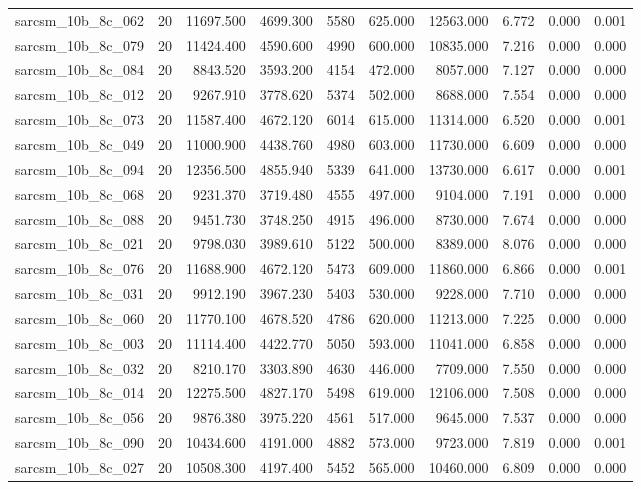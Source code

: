 \begin{tabular}{lrrrrrrrrr}
sarcsm\_10b\_8c\_062 & 20 & 11697.500 & 4699.300 & 5580 & 625.000 & 12563.000 & 6.772 & 0.000 & 0.001 \\
sarcsm\_10b\_8c\_079 & 20 & 11424.400 & 4590.600 & 4990 & 600.000 & 10835.000 & 7.216 & 0.000 & 0.000 \\
sarcsm\_10b\_8c\_084 & 20 & 8843.520 & 3593.200 & 4154 & 472.000 & 8057.000 & 7.127 & 0.000 & 0.000 \\
sarcsm\_10b\_8c\_012 & 20 & 9267.910 & 3778.620 & 5374 & 502.000 & 8688.000 & 7.554 & 0.000 & 0.000 \\
sarcsm\_10b\_8c\_073 & 20 & 11587.400 & 4672.120 & 6014 & 615.000 & 11314.000 & 6.520 & 0.000 & 0.001 \\
sarcsm\_10b\_8c\_049 & 20 & 11000.900 & 4438.760 & 4980 & 603.000 & 11730.000 & 6.609 & 0.000 & 0.000 \\
sarcsm\_10b\_8c\_094 & 20 & 12356.500 & 4855.940 & 5339 & 641.000 & 13730.000 & 6.617 & 0.000 & 0.001 \\
sarcsm\_10b\_8c\_068 & 20 & 9231.370 & 3719.480 & 4555 & 497.000 & 9104.000 & 7.191 & 0.000 & 0.000 \\
sarcsm\_10b\_8c\_088 & 20 & 9451.730 & 3748.250 & 4915 & 496.000 & 8730.000 & 7.674 & 0.000 & 0.000 \\
sarcsm\_10b\_8c\_021 & 20 & 9798.030 & 3989.610 & 5122 & 500.000 & 8389.000 & 8.076 & 0.000 & 0.000 \\
sarcsm\_10b\_8c\_076 & 20 & 11688.900 & 4672.120 & 5473 & 609.000 & 11860.000 & 6.866 & 0.000 & 0.001 \\
sarcsm\_10b\_8c\_031 & 20 & 9912.190 & 3967.230 & 5403 & 530.000 & 9228.000 & 7.710 & 0.000 & 0.000 \\
sarcsm\_10b\_8c\_060 & 20 & 11770.100 & 4678.520 & 4786 & 620.000 & 11213.000 & 7.225 & 0.000 & 0.000 \\
sarcsm\_10b\_8c\_003 & 20 & 11114.400 & 4422.770 & 5050 & 593.000 & 11041.000 & 6.858 & 0.000 & 0.000 \\
sarcsm\_10b\_8c\_032 & 20 & 8210.170 & 3303.890 & 4630 & 446.000 & 7709.000 & 7.550 & 0.000 & 0.000 \\
sarcsm\_10b\_8c\_014 & 20 & 12275.500 & 4827.170 & 5498 & 619.000 & 12106.000 & 7.508 & 0.000 & 0.000 \\
sarcsm\_10b\_8c\_056 & 20 & 9876.380 & 3975.220 & 4561 & 517.000 & 9645.000 & 7.537 & 0.000 & 0.000 \\
sarcsm\_10b\_8c\_090 & 20 & 10434.600 & 4191.000 & 4882 & 573.000 & 9723.000 & 7.819 & 0.000 & 0.001 \\
sarcsm\_10b\_8c\_027 & 20 & 10508.300 & 4197.400 & 5452 & 565.000 & 10460.000 & 6.809 & 0.000 & 0.000 \\

\end{tabular}
